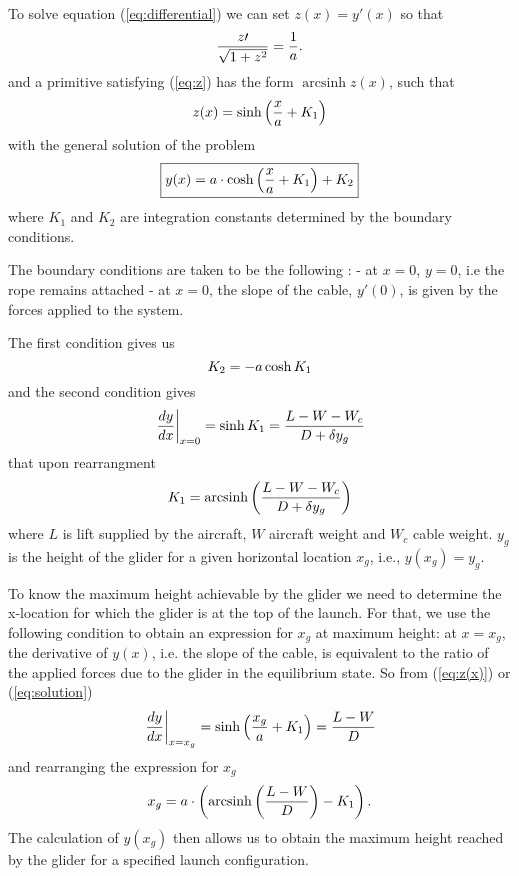 \documentclass[11pt]{amsart}
\DeclareMathOperator{\arcsinh}{arcsinh}
\begin{document}
To solve equation (\ref{eq:differential}) we can set $z(x)=y\prime(x)$ so that
\begin{equation}
	\centering
	\frac{z \prime}{\sqrt{1+z^2}} =\frac{1}{a}.
	\label{eq:z}
\end{equation}
and a primitive satisfying (\ref{eq:z}) has the form $\arcsinh{z(x)}$, such that
\begin{equation}
	\centering
	z(x)=\sinh \left(\frac{x}{a} + K_1 \right)
	\label{eq:z(x)}
\end{equation}
with the general solution of the problem
\begin{equation}
	\centering
	\boxed{y(x)=a \cdot \cosh \left(\frac{x}{a} + K_1 \right) + K_2}
	\label{eq:solution}
\end{equation}
where $K_1$ and $K_2$ are integration constants determined by the boundary conditions.

The boundary conditions are taken to be the following :\newline
- at $x=0$, $y=0$, i.e the rope remains attached \newline
- at $x=0$, the slope of the cable, $y\prime(0)$, is given by the forces applied to the system.

The first condition gives us
\begin{equation}
	\centering
	K_2 =-a \cosh{K_1}
	\label{eq:K2}
\end{equation}
and the second condition gives
\begin{equation}
	\centering
	\left. \frac{dy}{dx}\right|_{x=0} = \sinh{K_1} = \frac{L-W-W_c}{D + \delta y_g}
	\label{eq:bc1}
\end{equation}
that upon rearrangment
\begin{equation}
	\centering
	K_1 = \arcsinh \left(\frac{L-W-W_c}{D + \delta y_g}\right)
	\label{eq:K1}
\end{equation}
where $L$ is lift supplied by the aircraft, $W$ aircraft weight and $W_c$ cable weight. $y_g$ is the height of the glider for a given horizontal location $x_g$, i.e., $y(x_g)=y_g$. 

To know the maximum height achievable by the glider we need to determine the x-location for which the glider is at the top of the launch. For that, we use the following condition to obtain an expression for $x_g$ at maximum height: at $x=x_g$, the derivative of $y(x)$, i.e. the slope of the cable, is equivalent to the ratio of the applied forces due to the glider in the equilibrium state. So from (\ref{eq:z(x)}) or (\ref{eq:solution})
\begin{equation}
	\centering
	\left. \frac{dy}{dx}\right|_{x=x_g}=\sinh\left(\frac{x_g}{a} + K_1 \right) = \frac{L-W}{D}
	\label{eq:bc2}
\end{equation}
and rearranging the expression for $x_g$ 
\begin{equation}
	\centering
	 x_g=a \cdot \left( \arcsinh \left(\frac{L-W}{D}\right) - K_1 \right).
	\label{eq:x_g}
\end{equation}
The calculation of $y(x_g)$ then allows us to obtain the maximum height reached by the glider for a specified launch configuration.
\end{document}
